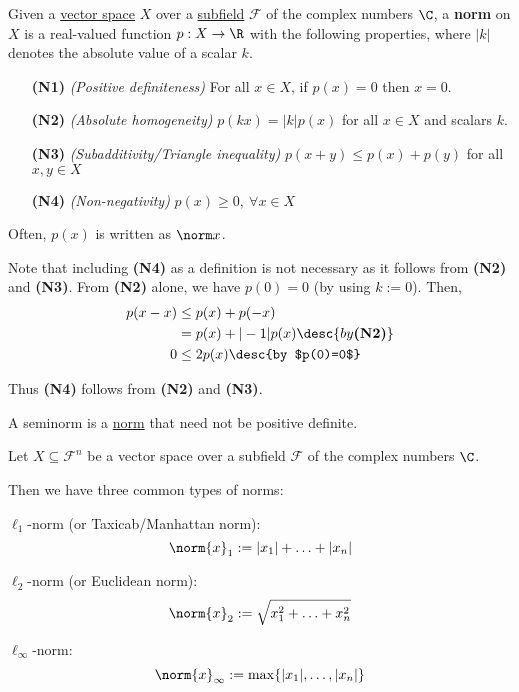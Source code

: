 \label{e0fff96}

Given a \href{fc83050}{vector space} $X$ over a \href{aec6040}{subfield}
$\mathcal F$ of the complex numbers $\C$, a \textbf{norm} on $X$ is a
real-valued function $p:X\to\R$ with the following properties, where $|k|$
denotes the absolute value of a scalar $k$.
\begin{enumerate}
  \item [\textbf{(N1)}] \textit{(Positive definiteness)} For all $x\in
        X$, if $p(x)=0$ then $x=0$.
  \item [\textbf{(N2)}] \textit{(Absolute homogeneity)}
        $p(kx)=|k|p(x)$ for all $x\in X$ and scalars $k$.
  \item [\textbf{(N3)}] \textit{(Subadditivity/Triangle inequality)}
        $p(x+y)\leq p(x)+p(y)$ for all $x,y\in X$
  \item [\textbf{(N4)}] \textit{(Non-negativity)}
        $p(x)\geq0,\ \forall x\in X$
\end{enumerate}

Often, $p(x)$ is written as $\norm x$.

Note that including \textbf{(N4)} as a definition is not necessary as it
follows from \textbf{(N2)} and \textbf{(N3)}. From \textbf{(N2)} alone, we have
$p(0)=0$ (by using $k:=0$). Then,
\begin{align*}
  p(x-x) &\leq p(x)+p(-x)                       \\
         &=p(x)+|-1|p(x)\desc{by \textbf{(N2)}} \\
  0      &\leq2p(x)\desc{by $p(0)=0$}
\end{align*}

Thus \textbf{(N4)} follows from \textbf{(N2)} and \textbf{(N3)}.

\label{fd3f98a}

A seminorm is a \href{e0fff96}{norm} that need not be positive definite.

\label{ef0996f}

Let $X\subseteq\mathcal F^n$ be a vector space over a subfield $\mathcal F$ of
the complex numbers $\C$.

Then we have three common types of norms:
\begin{enumerati}
  \item $\ell_1$-norm (or Taxicab/Manhattan norm):
  $$
    \norm{x}_1:=|x_1|+\ldots+|x_n|
  $$
  \item $\ell_2$-norm (or Euclidean norm):
  $$
    \norm{x}_2:=\sqrt{x_1^2+\ldots+x_n^2}
  $$
  \item $\ell_\infty$-norm:
  $$
    \norm{x}_\infty:=\max\{|x_1|,\ldots,|x_n|\}
  $$
\end{enumerati}


